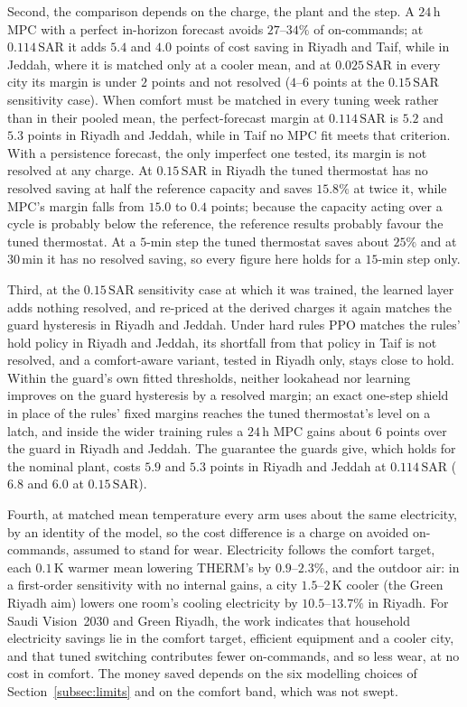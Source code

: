\documentclass[3p,twocolumn,number]{elsarticle}
\newcommand{\SAR}{\text{SAR}}
\begin{document}
Second, the comparison depends on the charge, the plant and the step. A $24\,$h MPC with a perfect in-horizon forecast avoids $27$--$34\%$ of on-commands; at $0.114\,\SAR$ it adds $5.4$ and $4.0$ points of cost saving in Riyadh and Taif, while in Jeddah, where it is matched only at a cooler mean, and at $0.025\,\SAR$ in every city its margin is under $2$ points and not resolved ($4$--$6$ points at the $0.15\,\SAR$ sensitivity case). When comfort must be matched in every tuning week rather than in their pooled mean, the perfect-forecast margin at $0.114\,\SAR$ is $5.2$ and $5.3$ points in Riyadh and Jeddah, while in Taif no MPC fit meets that criterion. With a persistence forecast, the only imperfect one tested, its margin is not resolved at any charge. At $0.15\,\SAR$ in Riyadh the tuned thermostat has no resolved saving at half the reference capacity and saves $15.8\%$ at twice it, while MPC's margin falls from $15.0$ to $0.4$ points; because the capacity acting over a cycle is probably below the reference, the reference results probably favour the tuned thermostat. At a $5$-min step the tuned thermostat saves about $25\%$ and at $30\,$min it has no resolved saving, so every figure here holds for a $15$-min step only.

Third, at the $0.15\,\SAR$ sensitivity case at which it was trained, the learned layer adds nothing resolved, and re-priced at the derived charges it again matches the guard hysteresis in Riyadh and Jeddah. Under hard rules PPO matches the rules' hold policy in Riyadh and Jeddah, its shortfall from that policy in Taif is not resolved, and a comfort-aware variant, tested in Riyadh only, stays close to hold. Within the guard's own fitted thresholds, neither lookahead nor learning improves on the guard hysteresis by a resolved margin; an exact one-step shield in place of the rules' fixed margins reaches the tuned thermostat's level on a latch, and inside the wider training rules a $24\,$h MPC gains about $6$ points over the guard in Riyadh and Jeddah. The guarantee the guards give, which holds for the nominal plant, costs $5.9$ and $5.3$ points in Riyadh and Jeddah at $0.114\,\SAR$ ($6.8$ and $6.0$ at $0.15\,\SAR$).

Fourth, at matched mean temperature every arm uses about the same electricity, by an identity of the model, so the cost difference is a charge on avoided on-commands, assumed to stand for wear. Electricity follows the comfort target, each $0.1\,$K warmer mean lowering THERM's by $0.9$--$2.3\%$, and the outdoor air: in a first-order sensitivity with no internal gains, a city $1.5$--$2\,$K cooler (the Green Riyadh aim) lowers one room's cooling electricity by $10.5$--$13.7\%$ in Riyadh. For Saudi Vision~2030 and Green Riyadh, the work indicates that household electricity savings lie in the comfort target, efficient equipment and a cooler city, and that tuned switching contributes fewer on-commands, and so less wear, at no cost in comfort. The money saved depends on the six modelling choices of Section~\ref{subsec:limits} and on the comfort band, which was not swept.
\end{document}
